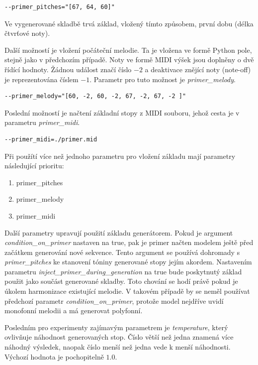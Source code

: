 \begin{verbatim}
--primer_pitches="[67, 64, 60]"
\end{verbatim}

Ve vygenerované skladbě trvá základ, 
vložený tímto způsobem, první dobu (délka čtvrťové noty).
\par

Další možností je vložení počáteční melodie.
Ta je vložena ve formě Python pole, stejně jako v předchozím případě.
Noty ve formě MIDI výšek jsou doplněny o dvě řídící hodnoty.
Žádnou událost značí číslo $-2$ a 
deaktivace znějící noty (note-off) je reprezentována číslem $-1$.
Parametr pro tuto možnost je \emph{primer\_melody}.

\begin{verbatim}
--primer_melody="[60, -2, 60, -2, 67, -2, 67, -2 ]"  
\end{verbatim}

Poslední možností je načtení základní stopy z MIDI souboru,
jehož cesta je v parametru \emph{primer\_midi}.
\begin{verbatim}
--primer_midi=./primer.mid 
\end{verbatim}

Při použítí více než jednoho parametru pro vložení základu
mají parametry následující prioritu:
\begin{enumerate}
    \item primer\_pitches
    \item primer\_melody
    \item primer\_midi
\end{enumerate}
\par

Další parametry upravují použití základu generátorem.
Pokud je argument \emph{condition\_on\_primer} nastaven na true, 
pak je primer načten modelem ještě před začátkem generování nové sekvence.
Tento argument se používá dohromady s \emph{primer\_pitches} 
ke stanovení tóniny generované stopy jejím akordem.
Nastavením parametru \emph{inject\_primer\_during\_generation} na true
bude poskytnutý základ použit jako součást generované skladby.
Toto chování se hodí právě pokud je úkolem harmonizace existující melodie.
V takovém případě by se neměl používat předchozí parametr \emph{condition\_on\_primer},
protože model nejdříve uvidí monofonní melodii 
a má generovat polyfonní.
\cite{google_git_polyphony}

\par
Posledním pro experimenty zajímavým parametrem je \emph{temperature},
který ovlivňuje náhodnost generovaných stop.
Číslo větší než jedna znamená více náhodný výsledek,
naopak číslo menší než jedna vede k menší náhodnosti.
Výchozí hodnota je pochopitelně $1.0$.
\par

